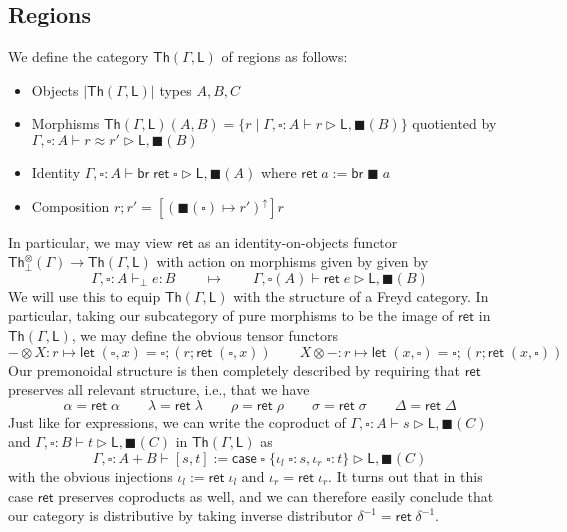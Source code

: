 \documentclass[acmsmall,screen,review]{acmart}
\newcommand{\ms}[1]{\ensuremath{\mathsf{#1}}}
\newcommand{\lto}{:}
\newcommand{\linl}[1]{\iota_l\;{#1}}
\newcommand{\linr}[1]{\iota_r\;{#1}}
\newcommand{\brb}[2]{\ms{br}\;#1\;#2}
\newcommand{\casestmt}[5]{\ms{case}\;#1\;\{\linl{#2} \lto #3, \linr{#4} \lto #5\}}
\newcommand{\upg}[1]{{#1}^\uparrow}
\newcommand{\bhyp}[2]{#1 : #2}
\newcommand{\hasty}[4]{#1 \vdash_{#2} #3: {#4}}
\newcommand{\haslb}[3]{#1 \vdash #2 \rhd #3}
\newcommand{\teqv}{\approx}
\newcommand{\lbeq}[4]{#1 \vdash #2 \teqv #3 \rhd {#4}}
\newcommand{\invar}{\square}
\newcommand{\outlb}{\blacksquare}
\begin{document}
\subsection{Regions}

We define the category $\ms{Th}(\Gamma, \ms{L})$ of regions as follows:
\begin{itemize}
  \item Objects $|\ms{Th}(\Gamma, \ms{L})|$ types $A, B, C$
  \item Morphisms $\ms{Th}(\Gamma, \ms{L})(A, B) = 
    \{r \mid \haslb{\Gamma, \bhyp{\invar}{A}}{r}{\ms{L}, \outlb(B)}\}$ 
    quotiented by $\lbeq{\Gamma, \bhyp{\invar}{A}}{r}{r'}{\ms{L}, \outlb(B)}$
  \item Identity $\haslb{\Gamma, \bhyp{\invar}{A}}{\ms{br}\;\ms{ret}\;\invar}{\ms{L}, \outlb(A)}$
    where $\ms{ret}\;a := \brb{\outlb}{a}$
  \item Composition $r;r' = [\upg{(\outlb(\invar) \mapsto r')}]r$
\end{itemize}
In particular, we may view $\ms{ret}$ as an identity-on-objects functor
$\ms{Th}^\otimes_\bot(\Gamma) \to \ms{Th}(\Gamma, \ms{L})$ with action on morphisms given by given
by 
\begin{equation}
  \hasty{\Gamma, \invar : A}{\bot}{e}{B} 
  \qquad \mapsto \qquad 
  \haslb{\Gamma, \invar(A)}{\ms{ret}\;e}{\ms{L}, \outlb(B)}
\end{equation}
We will use this to equip $\ms{Th}(\Gamma, \ms{L})$ with the structure of a Freyd category.
In particular, taking our subcategory of pure morphisms to be the image of $\ms{ret}$ in 
$\ms{Th}(\Gamma, \ms{L})$, we may define the obvious tensor functors
\begin{equation}
  - \otimes X : r \mapsto \ms{let}\;(\invar, x) = \invar; (r ; \ms{ret}\;(\invar, x)) \qquad
  X \otimes - : r \mapsto \ms{let}\;(x, \invar) = \invar; (r ; \ms{ret}\;(x, \invar))
\end{equation}
Our premonoidal structure is then completely described by requiring that $\ms{ret}$ preserves all
relevant structure, i.e., that we have
\begin{equation}
  \alpha = \ms{ret}\;\alpha \qquad
  \lambda = \ms{ret}\;\lambda \qquad
  \rho = \ms{ret}\;\rho \qquad
  \sigma = \ms{ret}\;\sigma \qquad
  \Delta = \ms{ret}\;\Delta
\end{equation}
Just like for expressions, we can write the coproduct of 
$\haslb{\Gamma, \bhyp{\invar}{A}}{s}{\ms{L}, \outlb(C)}$ and
$\haslb{\Gamma, \bhyp{\invar}{B}}{t}{\ms{L}, \outlb(C)}$
in $\ms{Th}(\Gamma, \ms{L})$ as
\begin{equation}
  \haslb{\Gamma, \invar : A + B}{[s, t] 
    := \casestmt{\invar}{\invar}{s}{\invar}{t}}{\ms{L}, \outlb(C)}
\end{equation}
with the obvious injections $\iota_l := \ms{ret}\;\iota_l$ and $\iota_r = \ms{ret}\;\iota_r$. It
turns out that in this case $\ms{ret}$ preserves coproducts as well, and we can therefore easily
conclude that our category is distributive by taking inverse distributor $\delta^{-1} =
\ms{ret}\;\delta^{-1}$.
\end{document}
